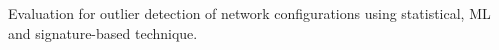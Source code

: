 Evaluation for outlier detection of network configurations using statistical, ML and signature-based technique.
